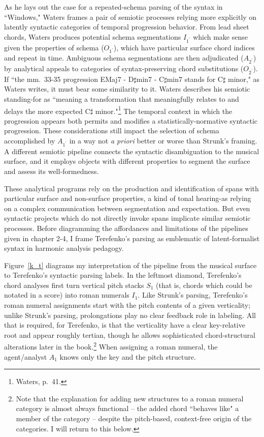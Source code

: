 As he lays out the case for a repeated-schema parsing of the syntax in ``Windows," Waters frames a pair of semiotic processes relying more explicitly on latently syntactic categories of temporal progression behavior.  From lead sheet chords, Waters produces potential schema segmentations $I_{1^{\prime}}$ which make sense given the properties of schema ($O_{1^{\prime}}$), which have particular surface chord indices and repeat in time.  Ambiguous schema segmentations are then adjudicated ($A_{2^{\prime}}$) by analytical appeals to categories of syntax-preserving chord substitutions ($O_{2^{\prime}}$).  If ``the mm.\ 33-35 progression EMaj7 - D$\sharp$min7 - C$\sharp$min7 stands for C$\sharp$ minor," as Waters writes, it must bear some similarity to it. Waters describes his semiotic standing-for as ``meaning a transformation that meaningfully relates to and delays the more expected C$\sharp$ minor."\footnote{Waters, p.\ 41.}  The temporal context in which the progression appears both permits and modifies a statistically-normative syntactic progression.  These considerations still impact the selection of schema accomplished by $A_{1^{\prime}}$ in a way not \emph{a priori} better or worse than Strunk's framing.  A different semiotic pipeline connects the syntactic disambiguation to the musical surface, and it employs objects with different properties to segment the surface and assess its well-formedness.

These analytical programs rely on the production and identification of spans with particular surface and non-surface properties, a kind of tonal hearing-as relying on a complex communication between segmentation and expectation.  But even syntactic projects which do not directly invoke spans implicate similar semiotic processes.  Before diagramming the affordances and limitations of the pipelines given in chapter 2-4, I frame Terefenko's parsing as emblematic of latent-formalist syntax in harmonic analysis pedagogy.

Figure~\ref{k_t} diagrams my interpretation of the pipeline from the musical surface to Terefenko's syntactic parsing labels.  In the leftmost diamond, Terefenko's chord analyses first turn vertical pitch stacks $S_1$ (that is, chords which could be notated in a score) into roman numerals $I_1$.  Like Strunk's parsing, Terefenko's roman numeral assignments start with the pitch contents of a given verticality; unlike Strunk's parsing, prolongations play no clear feedback role in labeling.  All that is required, for Terefenko, is that the verticality have a clear key-relative root and appear roughly tertian, though he allows sophisticated chord-structural alterations later in the book.\footnote{Note that the explanation for adding new structures to a roman numeral category is almost always functional -- the added chord ``behaves like" a member of the category -- despite the pitch-based, context-free origin of the categories.  I will return to this below.}  When assigning a roman numeral, the agent/analyst $A_1$ knows only the key and the pitch structure.

